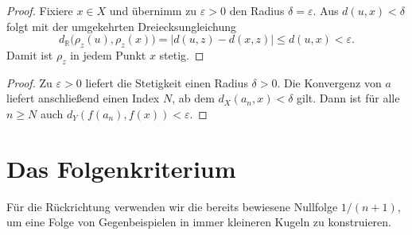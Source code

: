 \documentclass[main.tex]{subfiles}
\begin{document}
\begin{proof}
Fixiere \(x\in X\) und übernimm zu \(\varepsilon>0\) den Radius
\(\delta=\varepsilon\). Aus \(d(u,x)<\delta\) folgt mit der umgekehrten
Dreiecksungleichung
\[
 d_{\mathbb R}\bigl(\rho_z(u),\rho_z(x)\bigr)
 =|d(u,z)-d(x,z)|
 \leq d(u,x)<\varepsilon.
\]
Damit ist \(\rho_z\) in jedem Punkt \(x\) stetig.
\end{proof}

\begin{proof}
Zu \(\varepsilon>0\) liefert die Stetigkeit einen Radius \(\delta>0\).
Die Konvergenz von \(a\) liefert anschließend einen Index \(N\), ab dem
\(d_X(a_n,x)<\delta\) gilt. Dann ist für alle \(n\geq N\) auch
\(d_Y(f(a_n),f(x))<\varepsilon\).
\end{proof}

\section{Das Folgenkriterium}

Für die Rückrichtung verwenden wir die bereits bewiesene Nullfolge
\(1/(n+1)\), um eine Folge von Gegenbeispielen in immer kleineren Kugeln zu
konstruieren.
\end{document}
